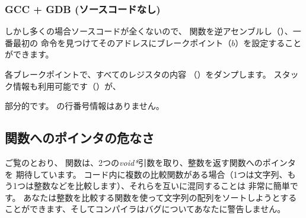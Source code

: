 

\subsubsection{GCC + GDB (ソースコードなし)}

しかし多くの場合ソースコードが全くないので、 \comp 関数を逆アセンブルし（）、一番最初の
\CMP 命令を見つけてそのアドレスにブレークポイント（$b$）を設定することができます。

各ブレークポイントで、すべてのレジスタの内容
（）をダンプします。 
スタック情報も利用可能です（）が、

部分的です。 \comp の行番号情報はありません。



\subsection{関数へのポインタの危なさ}

ご覧のとおり、 \qsort 関数は、2つの\emph{void*}引数を取り、整数を返す関数へのポインタを
期待しています。 
コード内に複数の比較関数がある場合（1つは文字列、もう1つは整数などを比較します）、それらを互いに混同することは
非常に簡単です。 
あなたは整数を比較する関数を使って文字列の配列をソートしようとすることができます、そしてコンパイラはバグについてあなたに警告しません。

